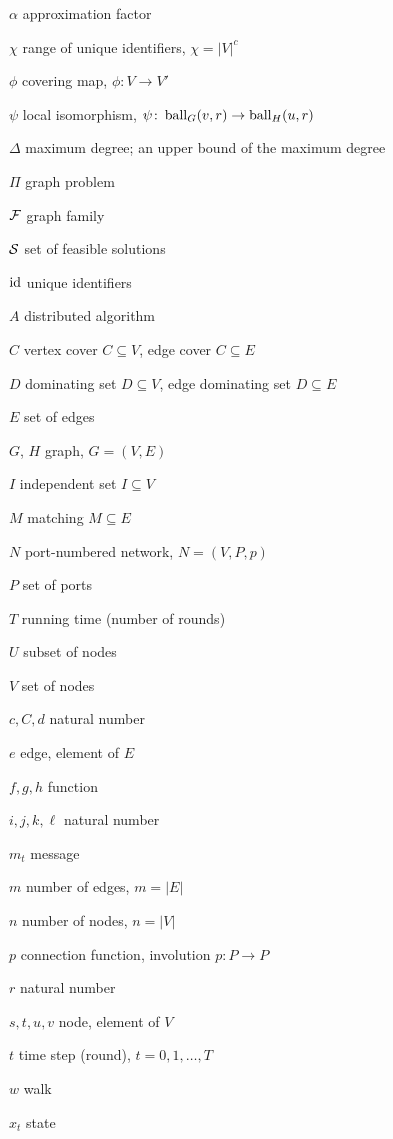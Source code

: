 {\raggedright
\begin{notation}
    \item[$\alpha$] approximation factor
    \item[$\chi$] range of unique identifiers, $\chi = |V|^c$
    \item[$\phi$] covering map, $\phi \colon V \to V'$
    \item[$\psi$] local isomorphism, $\psi \colon \operatorname{ball}_G(v,r) \to \operatorname{ball}_H(u,r)$
    \item[$\Delta$] maximum degree; an upper bound of the maximum degree
    \item[$\Pi$] graph problem
    \item[$\mathcal{F}$] graph family
    \item[$\mathcal{S}$] set of feasible solutions
    \item[$\operatorname{id}$] unique identifiers
    \item[$A$] distributed algorithm
    \item[$C$] vertex cover $C \subseteq V$, edge cover $C \subseteq E$
    \item[$D$] dominating set $D \subseteq V$, edge dominating set $D \subseteq E$
    \item[$E$] set of edges
    \item[$G$, $H$] graph, $G = (V,E)$
    \item[$I$] independent set $I \subseteq V$
    \item[$M$] matching $M \subseteq E$
    \item[$N$] port-numbered network, $N = (V,P,p)$
    \item[$P$] set of ports
    \item[$T$] running time (number of rounds)
    \item[$U$] subset of nodes
    \item[$V$] set of nodes
    \item[$c,C,d$] natural number
    \item[$e$] edge, element of $E$
    \item[$f,g,h$] function
    \item[$i,j,k,\ell$] natural number
    \item[$m_t$] message
    \item[$m$] number of edges, $m = |E|$
    \item[$n$] number of nodes, $n = |V|$
    \item[$p$] connection function, involution $p \colon P \to P$
    \item[$r$] natural number
    \item[$s,t,u,v$] node, element of $V$
    \item[$t$] time step (round), $t = 0, 1, \dotsc, T$
    \item[$w$] walk
    \item[$x_t$] state
\end{notation}}

